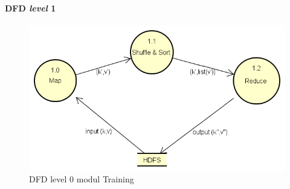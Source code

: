 \paragraph{DFD \textit{level} 1}
\begin{figure}[H]
	\centering
	\includegraphics[scale=0.65]{Diagram/DFD_1_0_Training_Testing}
	\caption[DFD level 0 modul Training]{DFD level 0 modul Training}
	\label{fig:DFD level 0 modul Training}
\end{figure}

